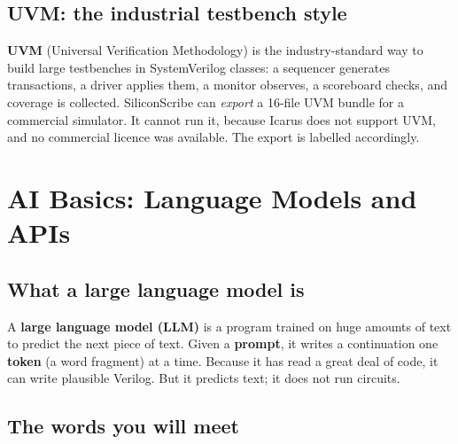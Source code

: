 \section{UVM: the industrial testbench style}

\textbf{UVM} (Universal Verification Methodology) is the industry-standard way to build large testbenches in SystemVerilog classes: a sequencer generates transactions, a driver applies them, a monitor observes, a scoreboard checks, and coverage is collected. SiliconScribe can \emph{export} a 16-file UVM bundle for a commercial simulator. It cannot run it, because Icarus does not support UVM, and no commercial licence was available. The export is labelled accordingly.

\chapter{AI Basics: Language Models and APIs}
\label{ch:ai}

\section{What a large language model is}

A \textbf{large language model (LLM)} is a program trained on huge amounts of text to predict the next piece of text. Given a \textbf{prompt}, it writes a continuation one \textbf{token} (a word fragment) at a time. Because it has read a great deal of code, it can write plausible Verilog. But it predicts text; it does not run circuits.

\section{The words you will meet}

